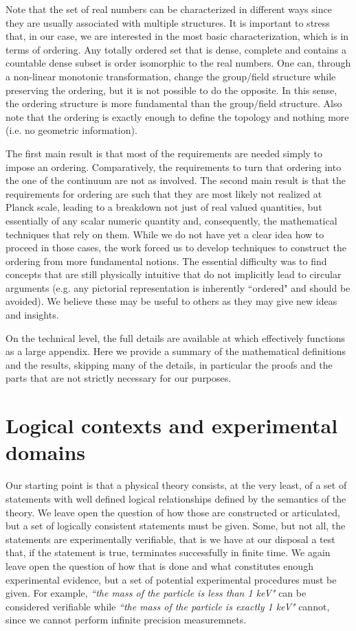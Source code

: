 \documentclass[submission,copyright,creativecommons]{eptcs}
\newcommand{\statement}[1] {\emph{``#1"}}
\begin{document}
Note that the set of real numbers can be characterized in different ways since they are usually associated with multiple structures. It is important to stress that, in our case, we are interested in the most basic characterization, which is in terms of ordering. Any totally ordered set that is dense, complete and contains a countable dense subset is order isomorphic to the real numbers. One can, through a non-linear monotonic transformation, change the group/field structure while preserving the ordering, but it is not possible to do the opposite. In this sense, the ordering structure is more fundamental than the group/field structure. Also note that the ordering is exactly enough to define the topology and nothing more (i.e. no geometric information).

The first main result is that most of the requirements are needed simply to impose an ordering. Comparatively, the requirements to turn that ordering into the one of the continuum are not as involved. The second main result is that the requirements for ordering are such that they are most likely not realized at Planck scale, leading to a breakdown not just of real valued quantities, but essentially of any scalar numeric quantity and, consequently, the mathematical techniques that rely on them. While we do not have yet a clear idea how to proceed in those cases, the work forced us to develop techniques to construct the ordering from more fundamental notions. The essential difficulty was to find concepts that are still physically intuitive that do not implicitly lead to circular arguments (e.g. any pictorial representation is inherently ``ordered" and should be avoided). We believe these may be useful to others as they may give new ideas and insights.

On the technical level, the full details are available at \cite{Carc3} which effectively functions as a large appendix. Here we provide a summary of the mathematical definitions and the results, skipping many of the details, in particular the proofs and the parts that are not strictly necessary for our purposes.

\section{Logical contexts and experimental domains}

Our starting point is that a physical theory consists, at the very least, of a set of statements with well defined logical relationships defined by the semantics of the theory. We leave open the question of how those are constructed or articulated, but a set of logically consistent statements must be given. Some, but not all, the statements are experimentally verifiable, that is we have at our disposal a test that, if the statement is true, terminates successfully in finite time. We again leave open the question of how that is done and what constitutes enough experimental evidence, but a set of potential experimental procedures must be given. For example, \statement{the mass of the particle is less than 1 keV} can be considered verifiable while \statement{the mass of the particle is exactly 1 keV} cannot, since we cannot perform infinite precision measuremnets.
\end{document}

